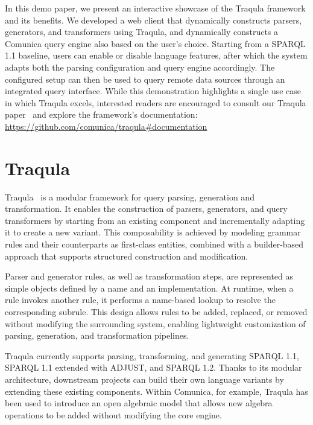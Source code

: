 \documentclass[runningheads]{llncs}
\begin{document}
    In this demo paper, we present an interactive showcase of the Traqula
    framework and its benefits. We developed a web client that dynamically
    constructs parsers, generators, and transformers using Traqula, and
    dynamically constructs a Comunica query engine also based on the user's
    choice. Starting from a SPARQL 1.1 baseline, users can enable or disable
    language features, after which the system adapts both the parsing
    configuration and query engine accordingly. The configured setup can
    then be used to query remote data sources through an integrated query
    interface. While this demonstration highlights a single use case in
    which Traqula excels, interested readers are encouraged to consult our
    Traqula paper~\cite{traqula} and explore the framework's documentation:\\
    \href{https://github.com/comunica/traqula\#documentation}{https://github.com/comunica/traqula\#documentation}


    \section{Traqula}
    \label{traqula}

    Traqula~\cite{traqula} is a modular framework for query
    parsing, generation and transformation. It enables the construction of
    parsers, generators, and query transformers by starting from an existing
    component and incrementally adapting it to create a new variant. This
    composability is achieved by modeling grammar rules and their
    counterparts as first-class entities, combined with a builder-based
    approach that supports structured construction and modification.

    Parser and generator rules, as well as transformation steps, are
    represented as simple objects defined by a name and an implementation.
    At runtime, when a rule invokes another rule, it performs a name-based
    lookup to resolve the corresponding subrule. This design allows rules to
    be added, replaced, or removed without modifying the surrounding system,
    enabling lightweight customization of parsing, generation, and
    transformation pipelines.

    Traqula currently supports parsing, transforming, and generating SPARQL
    1.1, SPARQL 1.1 extended with ADJUST, and SPARQL 1.2. Thanks to its
    modular architecture, downstream projects can build their own language
    variants by extending these existing components. Within Comunica, for
    example, Traqula has been used to introduce an open algebraic model that
    allows new algebra operations to be added without modifying the core
    engine.
\end{document}
